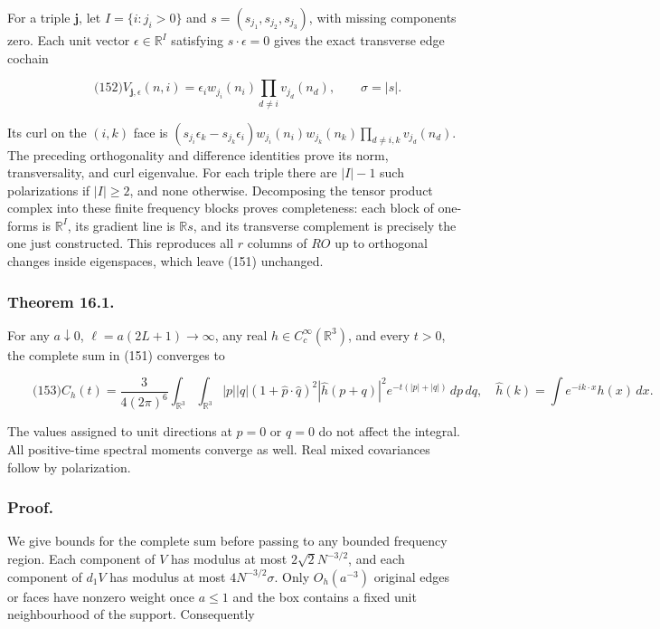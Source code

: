 For a triple \(\boldsymbol j\), let \(I=\{i:j_i>0\}\) and
\(s=(s_{j_1},s_{j_2},s_{j_3})\), with missing components zero. Each unit
vector \(\epsilon\in\mathbb R^I\) satisfying \(s\cdot\epsilon=0\) gives
the exact transverse edge cochain

\[
\qquad\text{(152)}
 V_{\boldsymbol j,\epsilon}(n,i)
   =\epsilon_i w_{j_i}(n_i)\prod_{d\ne i}v_{j_d}(n_d),
 \qquad \sigma=|s|.
\]

Its curl on the \((i,k)\) face is
\((s_{j_i}\epsilon_k-s_{j_k}\epsilon_i)
w_{j_i}(n_i)w_{j_k}(n_k)\prod_{d\ne i,k}v_{j_d}(n_d)\). The preceding
orthogonality and difference identities prove its norm, transversality,
and curl eigenvalue. For each triple there are \(|I|-1\) such
polarizations if \(|I|\ge2\), and none otherwise. Decomposing the tensor
product complex into these finite frequency blocks proves completeness:
each block of one-forms is \(\mathbb R^I\), its gradient line is
\(\mathbb Rs\), and its transverse complement is precisely the one just
constructed. This reproduces all \(r\) columns of \(RO\) up to
orthogonal changes inside eigenspaces, which leave (151) unchanged.

\subsubsection{Theorem 16.1.}\label{full-local-spectrum-md-theorem-16.1.}

For any \(a\downarrow0\), \(\ell=a(2L+1)\longrightarrow\infty\), any
real \(h\in C_c^\infty(\mathbb R^3)\), and every \(t>0\), the complete
sum in (151) converges to

\[
\qquad\text{(153)}
 C_h(t)=\frac{3}{4(2\pi)^6}
 \int_{\mathbb R^3}\int_{\mathbb R^3}
 |p||q|(1+\widehat p\cdot\widehat q)^2
 |\widehat h(p+q)|^2 e^{-t(|p|+|q|)}\,dp\,dq,
 \quad \widehat h(k)=\int e^{-ik\cdot x}h(x)\,dx.
\]

The values assigned to unit directions at \(p=0\) or \(q=0\) do not
affect the integral. All positive-time spectral moments converge as
well. Real mixed covariances follow by polarization.

\subsubsection{Proof.}\label{full-local-spectrum-md-proof.}

We give bounds for the complete sum before passing to any bounded
frequency region. Each component of \(V\) has modulus at most
\(2\sqrt2N^{-3/2}\), and each component of \(d_1V\) has modulus at most
\(4N^{-3/2}\sigma\). Only \(O_h(a^{-3})\) original edges or faces have
nonzero weight once \(a\le1\) and the box contains a fixed unit
neighbourhood of the support. Consequently

